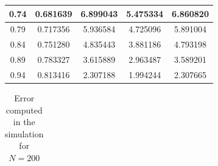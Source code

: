 \documentclass[aps,amsmath,amssymb,floatfix]{revtex4}
\begin{document}
\begin{enumerate}
\begin{enumerate}
\begin{table}[H]
\begin{tabular}{|c|c|c|c|c|}
	      	      		0.74         & 0.681639            & 6.899043            & 5.475334            & 6.860820            \\ \hline
	      	      		0.79         & 0.717356            & 5.936584            & 4.725096            & 5.891004            \\ \hline
	      	      		0.84         & 0.751280            & 4.835443            & 3.881186            & 4.793198            \\ \hline
	      	      		0.89         & 0.783327            & 3.615889            & 2.963487            & 3.589201            \\ \hline
	      	      		0.94         & 0.813416            & 2.307188            & 1.994244            & 2.307665            \\ \hline
	      	      	\end{tabular}
	      	      \end{table}
	      	          
	      	          
	      	      \begin{table}[H]
	      	      	\centering
	      	      	\caption{Error computed in the simulation for $N=200$}
	      	      	\label{tab:error_xy_200}
	      	      	\renewcommand{\arraystretch}{1.25}
	      	      	\setlength{\tabcolsep}{12pt}
	      	      	\begin{tabular}{|c|c|c|c|c|}
	      	      		\hline
	      	      		

\end{tabular}
\end{table}
\end{enumerate}
\end{enumerate}
\end{document}

